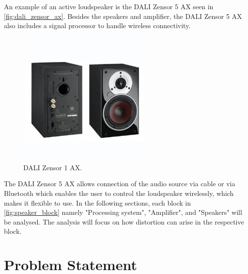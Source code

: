 An example of an active loudspeaker is the DALI Zensor 5 AX seen in \autoref{fig:dali_zensor_ax}. Besides the speakers and amplifier, the DALI Zensor 5 AX also includes a signal processor to handle wireless connectivity.
\begin{figure}[H]
\centering
\includegraphics[width=0.6\textwidth]{figures/dali_zensor_1_ax.jpg}
\caption{DALI Zensor 1 AX.}
\label{fig:dali_zensor_ax}
\end{figure}
The DALI Zensor 5 AX allows connection of the audio source via cable or via Bluetooth which enables the user to control the loudspeaker wirelessly, which makes it flexible to use. In the following sections, each block in \autoref{fig:speaker_block} namely "Processing system", "Amplifier", and "Speakers" will be analysed. The analysis will focus on how distortion can arise in the respective block.







%

%

%

%

%

\section{Problem Statement} \label{sec:problem_statement}

